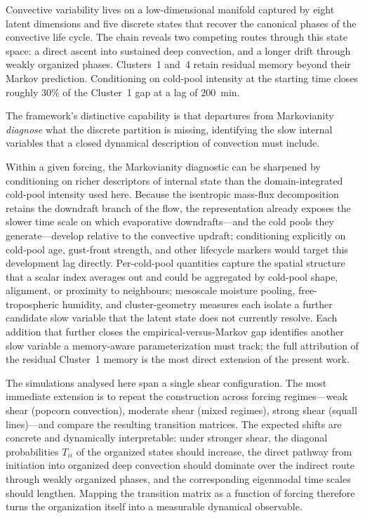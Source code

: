 \documentclass[11pt]{article}
\begin{document}
Convective variability lives on a low-dimensional manifold captured by eight latent dimensions and five discrete states that recover the canonical phases of the convective life cycle. The chain reveals two competing routes through this state space: a direct ascent into sustained deep convection, and a longer drift through weakly organized phases. Clusters~1 and~4 retain residual memory beyond their Markov prediction. Conditioning on cold-pool intensity at the starting time closes roughly $30\%$ of the Cluster~1 gap at a lag of $200$~min.

The framework's distinctive capability is that departures from Markovianity \emph{diagnose} what the discrete partition is missing, identifying the slow internal variables that a closed dynamical description of convection must include.

Within a given forcing, the Markovianity diagnostic can be sharpened by conditioning on richer descriptors of internal state than the domain-integrated cold-pool intensity used here. Because the isentropic mass-flux decomposition retains the downdraft branch of the flow, the representation already exposes the slower time scale on which evaporative downdrafts---and the cold pools they generate---develop relative to the convective updraft; conditioning explicitly on cold-pool age, gust-front strength, and other lifecycle markers would target this development lag directly. Per-cold-pool quantities capture the spatial structure that a scalar index averages out and could be aggregated by cold-pool shape, alignment, or proximity to neighbours; mesoscale moisture pooling, free-tropospheric humidity, and cluster-geometry measures each isolate a further candidate slow variable that the latent state does not currently resolve. Each addition that further closes the empirical-versus-Markov gap identifies another slow variable a memory-aware parameterization must track; the full attribution of the residual Cluster~1 memory is the most direct extension of the present work.


The simulations analysed here span a single shear configuration. The most immediate extension is to repeat the construction across forcing regimes---weak shear (popcorn convection), moderate shear (mixed regimes), strong shear (squall lines)---and compare the resulting transition matrices. The expected shifts are concrete and dynamically interpretable: under stronger shear, the diagonal probabilities $T_{ii}$ of the organized states should increase, the direct pathway from initiation into organized deep convection should dominate over the indirect route through weakly organized phases, and the corresponding eigenmodal time scales should lengthen. Mapping the transition matrix as a function of forcing therefore turns the organization itself into a measurable dynamical observable.
\end{document}
